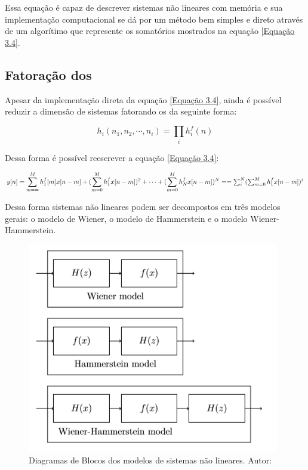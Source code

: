 Essa equação é capaz de descrever sistemas não lineares com memória e sua implementação computacional se dá por um método bem simples e direto através de um algorítimo que represente os somatórios mostrados na equação \ref{Equação 3.4}.

\subsection*{Fatoração dos  }
Apesar da implementação direta da equação \ref{Equação 3.4}, ainda é possível reduzir a dimensão de sistemas fatorando os  da seguinte forma:

\begin{equation}
h_{i}(n_{1},n_{2},\cdots,n_{i}) = \prod_{i} h_{i}^{f}(n)
\label{Equação 3.5}
\end{equation}

Dessa forma é possível reescrever a equação \ref{Equação 3.4}:

\begin{equation}
y[n] = \sum_{m==}^{M} h_{1}^{f}[m]x[n-m] +(\sum_{m=0}^{M}h_{1}^{f}x[n-m])^{2}+\cdots+(\sum_{m=0}^{M}h_{N}^{f}x[n-m])^{N} = $$
$$ =\sum_{i}^{N}(\sum_{m=0}^{M}h_{1}^{f}x[n-m])^{i}
\label{Equação 3.6}
\end{equation}

Dessa forma sistemas não lineares podem ser decompostos em três modelos gerais: o modelo de Wiener, o modelo de Hammerstein e o modelo Wiener-Hammerstein.

\begin{figure}[!htb]
	\centering
	\includegraphics[width=0.7\linewidth]{figuras/ModelosdeVolterra}
	\caption{Diagramas de Blocos dos modelos de sistemas não lineares. Autor:\cite{mavcak2012real}}
	\label{fig:modelosdevolterra}
\end{figure}

